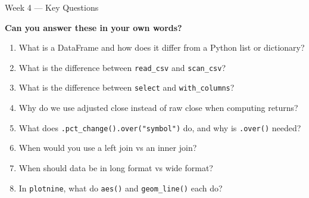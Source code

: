 \documentclass[9pt,aspectratio=169]{beamer}
\begin{document}
\begin{frame}{Week 4 --- Key Questions}

\textbf{Can you answer these in your own words?}

\begin{enumerate}
    \item What is a DataFrame and how does it differ from a Python list or dictionary?
    \item What is the difference between \texttt{read\_csv} and \texttt{scan\_csv}?
    \item What is the difference between \texttt{select} and \texttt{with\_columns}?
    \item Why do we use adjusted close instead of raw close when computing returns?
    \item What does \texttt{.pct\_change().over("symbol")} do, and why is \texttt{.over()} needed?
    \item When would you use a left join vs an inner join?
    \item When should data be in long format vs wide format?
    \item In \texttt{plotnine}, what do \texttt{aes()} and \texttt{geom\_line()} each do?
\end{enumerate}

\end{frame}
\end{document}
